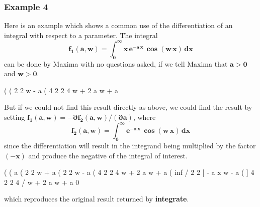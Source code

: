 \documentclass[12pt]{article}
\begin{document}
\subsubsection*{Example 4}
Here is an example which shows a common use of the differentiation of an 
  integral with respect to a parameter.
The integral 
\begin{equation}
\mathbf{f_{1}(a,w) =  \int_{0}^{\infty} x\,e^{- a\,x} \, \boldsymbol{\cos}(w\,x)\,dx}
\end{equation}
can be done by Maxima with no questions asked, if we tell 
  Maxima that $\mathbf{ a > 0}$ and $\mathbf{ w > 0}$.
\begin{myVerbatim}
(%
(%
                                      2    2
                                     w  - a
(%
                                 4      2  2    4
                                w  + 2 a  w  + a
\end{myVerbatim} 
But if we could not find this result directly as above, we could find the result
  by setting $\mathbf{f_{1}(a,w) = - \partial f_{2}(a,w)/(\partial a) }$, where
\begin{equation}
\mathbf{f_{2}(a,w) = \int_{0}^{\infty} e^{- a\,x} \, \boldsymbol{\cos}(w\,x)\,dx}
\end{equation}
since the differentiation will result in the integrand being
 multiplied by the  factor $\mathbf{(-x)}$ and produce the negative of the integral of interest.
\begin{myVerbatim}
(%
(%
                                       a
(%
                                     2    2
                                    w  + a
(%
                                     2    2
                                    w  - a
(%
                                4      2  2    4
                               w  + 2 a  w  + a
(%
                inf
               /                                    2    2
               [        - a x                      w  - a
(%
               ]                               4      2  2    4
               /                              w  + 2 a  w  + a
                0
\end{myVerbatim} 
which reproduces the original result returned by \textbf{integrate}.
\newpage
\end{document}
